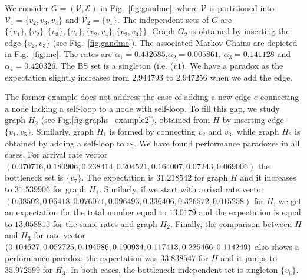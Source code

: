 \documentclass{llncs}
\begin{document}
We consider $G=(\mathcal{V},\mathcal{E})$ in Fig.~\ref{fig:gandmc}, where $\mathcal{V}$ is partitioned into $\mathcal{V}_1=\{v_2, v_3, v_4\}$ and $\mathcal{V}_2=\{v_1\}$. The independent sets of $\check{G}$ are 
$
\{\{v_1\}, \{v_2\}, \{v_3\}, \{v_4\}, \{v_2,v_4\}, \{v_2,v_3\}\}
$.
Graph $G_2$ is 
obtained by inserting the edge $\{v_2,v_3\}$ (see Fig.~\ref{fig:gandmc}). The associated Markov Chains are depicted in Fig.~\ref{fig:mc}. 
The rates are 
$\alpha_1 = 0.432685$,$\alpha_2 = 0.005861$, $\alpha_3 = 0.141128$ and 
$\alpha_4 = 0.420326$. The BS set is a singleton (i.e. ($v1$). 
We have a paradox as the expectation slightly increases from 
$2.944793$ to $2.947256$ when we add the edge. 



The former example does not address the case of adding a new edge $e$ connecting a node lacking a self-loop to a node with self-loop. To fill this gap, we study graph $H_2$ (see Fig.\ref{fig:graphs_example2}),  obtained from $H$ by inserting edge $\{v_1,v_5\}$. Similarly, graph $H_1$ is formed by connecting $v_2$ and $v_3$, while graph $H_3$ is obtained by adding a self-loop to {$v_5$}. We have found performance paradoxes in all cases.
For arrival rate vector 
$( 0.070716, 0.180906, 0.238414, 0.204521,  0.164007, 0.07243, 
0.069006)$
the bottleneck set is $\{v_7\}$. The expectation is $31.218542$ for graph $H$ 
and it increases to 
$ 31.539906$ for graph $H_1$.  
Similarly, if we start with arrival rate vector 
$( 0.08502,  0.06418,  0.076071,  0.096493,  0.336406, 0.326572, 0.015258)$
for $H$, we get an expectation for the total number equal to $13.0179$ and the expectation is equal to $13.058815$ for the same rates and graph $H_2$. Finally, 
the comparison between $H$ and $H_3$ for rate vector $(0.104627, 0.052725,  0.194586, 0.190934, 0.117413, 0.225466,\\ 0.114249)$ also shows a performance
paradox: the expectation was $33.838547$ for $H$ and it jumps to $35.972599$ for $H_3$. In both cases, the bottleneck independent  set is singleton $\{v_6 \}$. 
\end{document}

